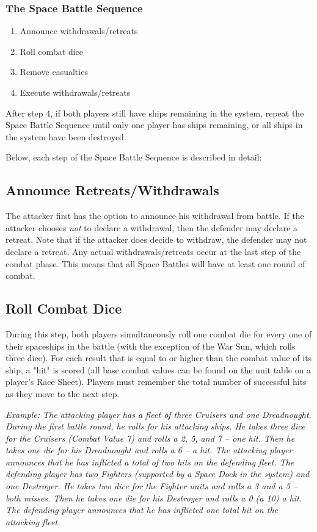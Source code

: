\documentclass[11pt,fleqn]{book} %
\begin{document}
\subsubsection{The Space Battle Sequence}
\begin{enumerate}
    \item Announce withdrawals/retreats
    \item Roll combat dice
    \item Remove casualties
    \item Execute withdrawals/retreats
\end{enumerate}
After step 4, if both players still have ships remaining in the system, repeat the Space Battle Sequence until only one player has ships remaining, or all ships in the system have been destroyed.

Below, each step of the Space Battle Sequence is described in detail:


\subsection{Announce Retreats/Withdrawals}
The attacker first has the option to announce his withdrawal from battle. If the attacker chooses \emph{not} to declare a withdrawal, then the defender may declare a retreat. Note that if the attacker does decide to withdraw, the defender may not declare a retreat. Any actual withdrawals/retreats occur at the last step of the combat phase. This means that all Space Battles will have at least one round of combat.

\subsection{Roll Combat Dice}
During this step, both players simultaneously roll one combat die for every one of their spaceships in the battle (with the exception of the War Sun, which rolls three dice). For each result that is equal to or higher than the combat value of its ship, a "hit" is scored (all base combat values can be found on the unit table on a player’s Race Sheet). Players must remember the total number of successful hits as they move to the next step.

\emph{Example: The attacking player has a fleet of three Cruisers and one Dreadnought. During the first battle round, he rolls for his attacking ships. He takes three dice for the Cruisers (Combat Value 7) and rolls a 2, 5, and 7 -- one hit. Then he takes one die for his Dreadnought and rolls a 6 -- a hit. The attacking player announces that he has inflicted a total of two hits on the defending fleet. The defending player has two Fighters (supported by a Space Dock in the system) and one Destroyer. He takes two dice for the Fighter units and rolls a 3 and a 5 -- both misses. Then he takes one die for his Destroyer and rolls a 0 (a 10) a hit. The defending player announces that he has inflicted one total hit on the attacking fleet.}
\end{document}
